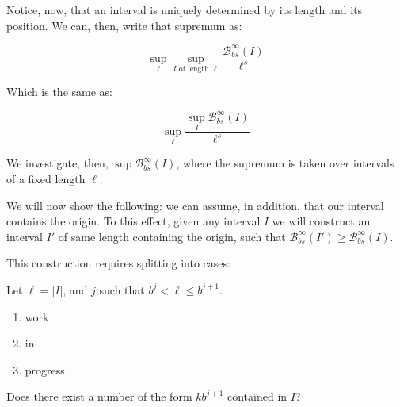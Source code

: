 \documentclass[11pt, reqno]{amsart}
\newcommand{\BB}{\mathcal{B}}
\begin{document}
Notice, now, that an interval is uniquely determined by its length and its position. We can, then, write that supremum as:

\[\sup_\ell \sup_\text{$I$ of length $\ell$} \frac{\BB_{bs}^\infty(I)}{\ell^s}\]

Which is the same as:

\[\sup_\ell \frac{\sup_I \BB_{bs}^\infty(I)}{\ell^s}\]

We investigate, then, $\sup \BB_{bs}^\infty(I)$, where the supremum is taken over intervals of a fixed length $\ell$.

We will now show the following: we can assume, in addition, that our interval contains the origin. To this effect, given any interval $I$ we will construct an interval $I'$ of same length containing the origin, such that $\BB_{bs}^\infty(I') \geq \BB_{bs}^\infty(I)$.

This construction requires splitting into cases:

Let $\ell = \lvert I \rvert$, and $j$ such that $b^j < \ell \leq b^{j+1}$.

\begin{enumerate}[label=\textbf{Case \arabic*: }]
\item work

\item in

\item progress
\end{enumerate}

Does there exist a number of the form $k b^{j+1}$ contained in $I$?
\end{document}
